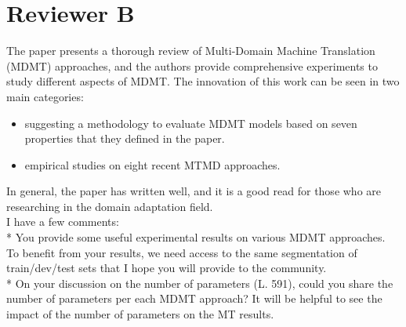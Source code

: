 \documentclass[12pt,times,a4paper,twoside]{article}
\newcommand{\fyTodo}[1]{\Todo[FY:]{\textcolor{orange}{#1}}}
\theoremstyle{definition}
\begin{document}
\section*{Reviewer B}
The paper presents a thorough review of Multi-Domain Machine Translation (MDMT) approaches, and the authors provide comprehensive experiments to study different aspects of MDMT. The innovation of this work can be seen in two main categories:
\begin{itemize}
	\item suggesting a methodology to evaluate MDMT models based on seven properties that they defined in the paper.
	\item empirical studies on eight recent MTMD approaches.
\end{itemize}
In general, the paper has written well, and it is a good read for those who are researching in the domain adaptation field. 
\\
I have a few comments:
\\
* You provide some useful experimental results on various MDMT approaches. To benefit from your results, we need access to the same segmentation of train/dev/test sets that I hope you will provide to the community.
\fyTodo{to share data}
\\
* On your discussion on the number of parameters (L. 591), could you share the number of parameters per each MDMT approach? It will be helpful to see  the impact of the number of parameters on the MT 
results.
\\ 
\end{document}
